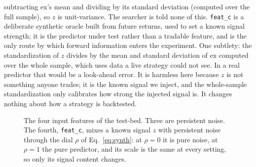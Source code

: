 \documentclass[11pt]{article}
\newcommand{\code}[1]{\texttt{#1}}
\begin{document}
subtracting $\mathrm{ex}$'s mean and dividing by its standard deviation (computed over the full sample),
so $z$ is unit-variance. The searcher is told none of this.
\code{feat\_c} is a deliberate synthetic oracle built from future returns, used to set a known signal
strength; it is the predictor under test rather than a tradable feature, and is the only route by
which forward information enters the experiment. One subtlety: the standardization of $z$ divides by the
mean and standard deviation of $\mathrm{ex}$ computed over the whole sample, which uses data a live
strategy could not see. In a real predictor that would be a look-ahead error. It is harmless here because
$z$ is not something anyone trades; it is the known signal we inject, and the whole-sample
standardization only calibrates how strong the injected signal is. It changes nothing about how a
strategy is backtested.

\begin{figure}[htbp]
\centering
{}
\caption{The four input features of the test-bed. Three are persistent noise. The fourth,
\code{feat\_c}, mixes a known signal $z$ with persistent noise through the dial $\rho$ of
Eq.~\eqref{eq:synth}: at $\rho=0$ it is pure noise, at $\rho=1$ the pure predictor, and its scale is the
same at every setting, so only its signal content changes.}
\label{fig:dial}
\end{figure}
\end{document}
